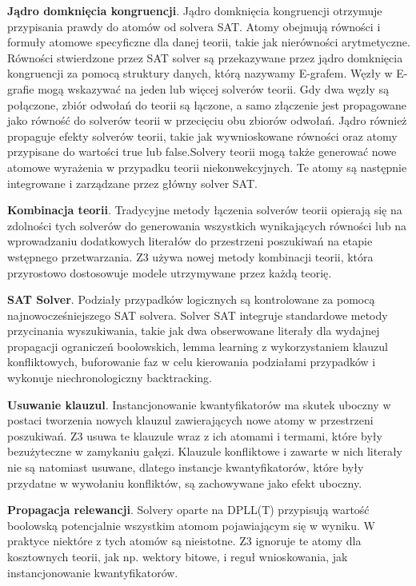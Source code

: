 \textbf{Jądro domknięcia kongruencji}. Jądro domknięcia kongruencji otrzymuje przypisania prawdy do atomów od solvera SAT. Atomy obejmują równości i formuły atomowe specyficzne dla danej teorii, takie jak nierówności arytmetyczne. Równości stwierdzone przez SAT solver są przekazywane przez jądro domknięcia kongruencji za pomocą struktury danych, którą nazywamy E-grafem. Węzły w E-grafie mogą wskazywać na jeden lub więcej solverów teorii. Gdy dwa węzły są połączone, zbiór odwołań do teorii są łączone, a samo złączenie jest propagowane jako równość do solverów teorii w przecięciu obu zbiorów odwołań. Jądro również propaguje efekty solverów teorii, takie jak wywnioskowane równości oraz atomy przypisane do wartości true lub false.Solvery teorii mogą także generować nowe atomowe wyrażenia w przypadku teorii niekonwekcyjnych. Te atomy są następnie integrowane i zarządzane przez główny solver SAT.

\textbf{Kombinacja teorii}. Tradycyjne metody łączenia solverów teorii opierają się na zdolności tych solverów do generowania wszystkich wynikających równości lub na wprowadzaniu dodatkowych literałów do przestrzeni poszukiwań na etapie wstępnego przetwarzania. Z3 używa nowej metody kombinacji teorii, która przyrostowo dostosowuje modele utrzymywane przez każdą teorię.

\textbf{SAT Solver}. Podziały przypadków logicznych są kontrolowane za pomocą najnowocześniejszego SAT solvera. Solver SAT integruje standardowe metody przycinania wyszukiwania, takie jak dwa obserwowane literały dla wydajnej propagacji ograniczeń boolowskich, lemma learning z wykorzystaniem klauzul konfliktowych, buforowanie faz w celu kierowania podziałami przypadków i wykonuje niechronologiczny backtracking.

\textbf{Usuwanie klauzul}. Instancjonowanie kwantyfikatorów ma skutek uboczny w postaci tworzenia nowych klauzul zawierających nowe atomy w przestrzeni poszukiwań. Z3 usuwa te klauzule wraz z ich atomami i termami, które były bezużyteczne w zamykaniu gałęzi. Klauzule konfliktowe i zawarte w nich literały nie są natomiast usuwane, dlatego instancje kwantyfikatorów, które były przydatne w wywołaniu konfliktów, są zachowywane jako efekt uboczny.

\textbf{Propagacja relewancji}. Solvery oparte na DPLL(T) przypisują wartość boolowską potencjalnie wszystkim atomom pojawiającym się w wyniku. W praktyce niektóre z tych atomów są nieistotne. Z3 ignoruje te atomy dla kosztownych teorii, jak np. wektory bitowe, i reguł wnioskowania, jak instancjonowanie kwantyfikatorów.

